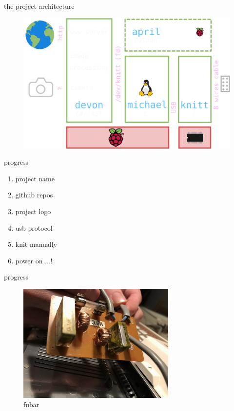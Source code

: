 \begin{frame}{the project architecture}
    \begin{figure}
        \includegraphics[width=1\textwidth]{./images/architecture.png}
    \end{figure}
\end{frame}



\begin{frame}{progress}
    \begin{enumerate}
        \item project name \pause \emojiCheck \pause
        \item github repos \pause \emojiCheck \pause
        \item project logo \pause \emojiCheck \pause
        \item usb protocol \pause \emojiCheck \pause
        \item knit manually \pause \emojiCheck \pause
        \item power on ...! \pause
    \end{enumerate}

    \center
     \pause %
     \pause %
     \pause %
     \pause %
\end{frame}


\begin{frame}{progress}
    \begin{figure}
        \includegraphics[width=0.7\textwidth]{./images/exploded-capacitor.png}
        \caption{fubar}
    \end{figure}
\end{frame}

